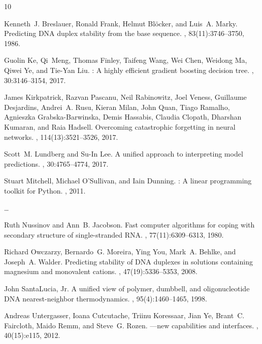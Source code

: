 \documentclass[twocolumn,10pt]{article}
\begin{document}

\begin{thebibliography}{10}

Kenneth~J. Breslauer, Ronald Frank, Helmut Bl{\"o}cker, and Luis~A. Marky.
\newblock Predicting {DNA} duplex stability from the base sequence.
,
  83(11):3746--3750, 1986.

Guolin Ke, Qi~Meng, Thomas Finley, Taifeng Wang, Wei Chen, Weidong Ma, Qiwei
  Ye, and Tie-Yan Liu.
: A highly efficient gradient boosting decision tree.
,
  30:3146--3154, 2017.

James Kirkpatrick, Razvan Pascanu, Neil Rabinowitz, Joel Veness, Guillaume
  Desjardins, Andrei~A. Rusu, Kieran Milan, John Quan, Tiago Ramalho, Agnieszka
  Grabska-Barwinska, Demis Hassabis, Claudia Clopath, Dharshan Kumaran, and Raia
  Hadsell.
\newblock Overcoming catastrophic forgetting in neural networks.
,
  114(13):3521--3526, 2017.

Scott~M. Lundberg and Su-In Lee.
\newblock A unified approach to interpreting model predictions.
,
  30:4765--4774, 2017.

Stuart Mitchell, Michael O'Sullivan, and Iain Dunning.
: A linear programming toolkit for {Python}.
, 2011.

\dots

Ruth Nussinov and Ann~B. Jacobson.
\newblock Fast computer algorithms for coping with secondary structure of
  single-stranded {RNA}.
,
  77(11):6309--6313, 1980.

Richard Owczarzy, Bernardo~G. Moreira, Ying You, Mark~A. Behlke, and Joseph~A.
  Walder.
\newblock Predicting stability of {DNA} duplexes in solutions containing
  magnesium and monovalent cations.
, 47(19):5336--5353, 2008.

John SantaLucia, Jr.
\newblock A unified view of polymer, dumbbell, and oligonucleotide {DNA}
  nearest-neighbor thermodynamics.
,
  95(4):1460--1465, 1998.

Andreas Untergasser, Ioana Cutcutache, Triinu Koressaar, Jian Ye, Brant~C.
  Faircloth, Maido Remm, and Steve~G. Rozen.
---new capabilities and interfaces.
, 40(15):e115, 2012.

\end{thebibliography}
\end{document}
